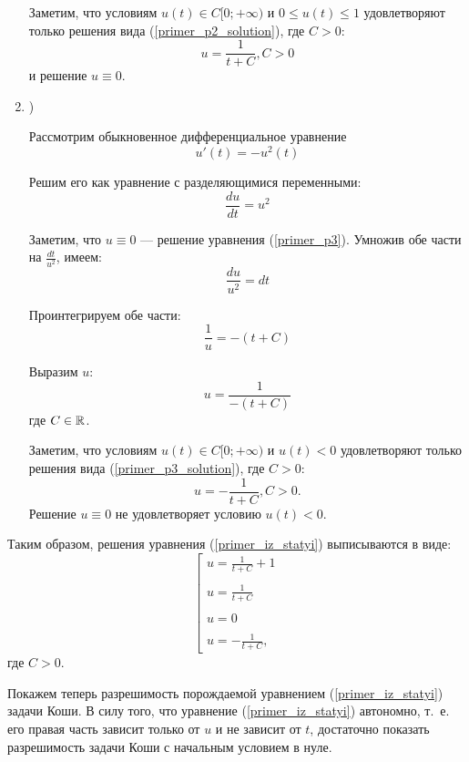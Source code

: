 \begin{enumerate}
Заметим, что условиям $u(t) \in C[0; +\infty)$ и $0 \leq u(t) \leq 1$ удовлетворяют только решения вида (\ref{primer_p2_solution}), где $C>0$:
\begin{equation}
	u=\frac{1}{t+C}, C>0
\end{equation}
и решение $u \equiv 0$.




\item)

Рассмотрим обыкновенное дифференциальное уравнение
\begin{equation}\label{primer_p3}
	u'(t)=-u^2(t)
\end{equation}

Решим его как уравнение с разделяющимися переменными:
$$
	\frac{du}{dt}=u^2
$$

Заметим, что $u\equiv 0$ --- решение уравнения (\ref{primer_p3}).
Умножив обе части на $\frac{dt}{u^2}$, имеем:
$$
	\frac{du}{u^2}=dt
$$

Проинтегрируем обе части:
$$
	\frac{1}{u}=-(t+C)
$$

Выразим $u$:
\begin{equation}\label{primer_p3_solution}
	u=\frac{1}{-(t+C)}
\end{equation}
где $C\in\mathbb{R}$.

Заметим, что условиям $u(t) \in C[0; +\infty)$ и $u(t) < 0$ удовлетворяют только решения вида (\ref{primer_p3_solution}), где $C>0$:
\begin{equation}
	u=-\frac{1}{t+C}, C>0.
\end{equation}
Решение $u \equiv 0$ не удовлетворяет условию $u(t)<0$.

\end{enumerate}

Таким образом, решения уравнения (\ref{primer_iz_statyi}) выписываются в виде:
\begin{equation}\label{primer_iz_statyi_u_t}
	\left[
		\begin{array}{l}
			u=\frac{1}{t+C}+1
		\\\\
			u=\frac{1}{t+C}
		\\\\
			u=0
		\\\\
			u=-\frac{1}{t+C},
		\end{array}
	\right.
\end{equation}
где $C>0$.

Покажем теперь разрешимость порождаемой уравнением (\ref{primer_iz_statyi}) задачи Коши.
В силу того, что уравнение (\ref{primer_iz_statyi}) автономно, т.~е. его правая часть зависит только от $u$ и не зависит от $t$,
достаточно показать разрешимость задачи Коши с начальным условием в нуле.

